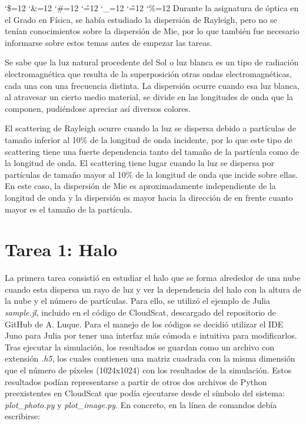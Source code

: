 \documentclass[10pt,letterpaper]{article}
\newenvironment{simplechar}{%
   \catcode`\$=12
   \catcode`\&=12
   \catcode`\#=12
   \catcode`\^=12
   \catcode`\_=12
   \catcode`\~=12
   \catcode`\%=12}{}
\begin{document}
\begin{simplechar}
\bigskip
Durante la asignatura de óptica en el Grado en Física, se había estudiado la dispersión de Rayleigh, pero no se tenían conocimientos sobre la dispersión de Mie, por lo que también fue necesario informarse sobre estos temas antes de empezar las tareas.
 
\bigskip
Se sabe que la luz natural procedente del Sol o luz blanca es un tipo de radiación electromagnética que resulta de la superposición otras ondas electromagnéticas, cada una con una frecuencia distinta. La dispersión ocurre cuando esa luz blanca, al atravesar un cierto medio material, se divide en las longitudes de onda que la componen, pudiéndose apreciar así diversos colores. 

\bigskip
El scattering de Rayleigh ocurre cuando la luz se dispersa debido a partículas de tamaño inferior al 10\% de la longitud de onda incidente, por lo que este tipo de scattering tiene una fuerte dependencia tanto del tamaño de la partícula como de la longitud de onda. El scattering tiene lugar cuando la luz se dispersa por partículas de tamaño mayor al 10\% de la longitud de onda que incide sobre ellas. En este caso, la dispersión de Mie es aproximadamente independiente de la longitud de onda y la dispersión es mayor hacia la dirección de en frente cuanto mayor es el tamaño de la partícula.

\section{Tarea 1: Halo}

La primera tarea consistió en estudiar el halo que se forma alrededor de una nube cuando esta dispersa un rayo de luz y ver la dependencia del halo con la altura de la nube y el número de partículas. Para ello, se utilizó el ejemplo de Julia \textit{sample.jl}, incluido en el código de CloudScat, descargado del repositorio de GitHub de A. Luque. Para el manejo de los códigos se decidió utilizar el IDE Juno para Julia por tener una interfaz más cómoda e intuitiva para modificarlos. Tras ejecutar la simulación, los resultados se guardan como un archivo con extensión \textit{.h5}, los cuales contienen una matriz cuadrada con la misma dimensión que el número de píxeles (1024x1024) con los resultados de la simulación. Estos resultados podían representarse a partir de otros dos archivos de Python preexistentes en CloudScat que podía ejecutarse desde el símbolo del sistema: \textit{plot_photo.py} y \textit{plot_image.py}. En concreto, en la línea de comandos debía escribirse:


\end{simplechar}
\end{document}
